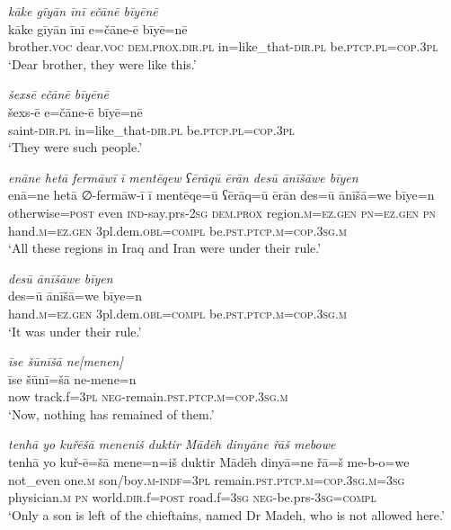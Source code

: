 \ea \label{ŠJ.99}
\textit{kāke gīyān īnī ečānē bīyēnē} \\ 
\gll kāke gīyān īnī e=čāne-ē bīyē=nē \\ 
 brother.\textsc{voc} dear.\textsc{voc} \textsc{dem.prox}\textsc{.dir}\textsc{.pl} in=like\_that\textsc{-dir}\textsc{.pl} be\textsc{.ptcp}\textsc{.pl}\textsc{=cop}\textsc{.3pl} \\ 
\glt `Dear brother, they were like this.'
\z 
 
\ea \label{ŠJ.100}
\textit{šexsē ečānē bīyēnē} \\ 
\gll šexs-ē e=čāne-ē bīyē=nē \\ 
 saint\textsc{-dir}\textsc{.pl} in=like\_that\textsc{-dir}\textsc{.pl} be\textsc{.ptcp}\textsc{.pl}\textsc{=cop}\textsc{.3pl} \\ 
\glt `They were such people.'
\z 
 
\ea \label{ŠJ.102}
\textit{enāne hetā fermāwī ī mentēqew ʕērāqū ērān desū ānīšāwe bīyen} \\ 
\gll enā=ne hetā ∅-fermāw-ī ī mentēqe=ū ʕērāq=ū ērān des=ū ānīšā=we bīye=n \\ 
 otherwise\textsc{=\textsc{post}} even \textsc{ind-}say.prs-\textsc{2sg} \textsc{dem.prox} region\textsc{.m}\textsc{=ez.gen} \textsc{pn}\textsc{=ez.gen} \textsc{pn} hand\textsc{.m}\textsc{=ez.gen} 3pl.dem\textsc{.obl}\textsc{=compl} be\textsc{.pst}\textsc{.ptcp}\textsc{.m}\textsc{=cop}\textsc{.3sg}\textsc{.m} \\ 
\glt `All these regions in Iraq and Iran were under their rule.'
\z 
 
\ea \label{ŠJ.103}
\textit{desū ānīšāwe bīyen} \\ 
\gll des=ū ānīšā=we bīye=n \\ 
 hand\textsc{.m}\textsc{=ez.gen} 3pl.dem\textsc{.obl}\textsc{=compl} be\textsc{.pst}\textsc{.ptcp}\textsc{.m}\textsc{=cop}\textsc{.3sg}\textsc{.m} \\ 
\glt `It was under their rule.'
\z 
 
\ea \label{ŠJ.104}
\textit{īse šūnīšā ne[menen]} \\ 
\gll īse šūnī=šā ne-mene=n \\ 
 now track.f\textsc{=3pl} \textsc{neg-}remain\textsc{.pst}\textsc{.ptcp}\textsc{.m}\textsc{=cop}\textsc{.3sg}\textsc{.m} \\ 
\glt `Now, nothing has remained of them.'
\z 
 
\ea \label{ŠJ.105}
\textit{tenhā yo kuřēšā meneniš duktir Mādēh dinyāne řāš mebowe} \\ 
\gll tenhā yo kuř-ē=šā mene=n=iš duktir Mādēh dinyā=ne řā=š me-b-o=we \\ 
 not\_even one\textsc{.m} son/boy\textsc{.m}\textsc{-indf}\textsc{=3pl} remain\textsc{.pst}\textsc{.ptcp}\textsc{.m}\textsc{=cop}\textsc{.3sg}\textsc{.m}\textsc{=3sg} physician\textsc{.m} \textsc{pn} world\textsc{.dir}.f\textsc{=\textsc{post}} road.f\textsc{=3sg} \textsc{neg-}be.prs\textsc{-3sg}\textsc{=compl} \\ 
\glt `Only a son is left of the chieftains, named Dr Madeh, who is not allowed here.'
\z 
 
